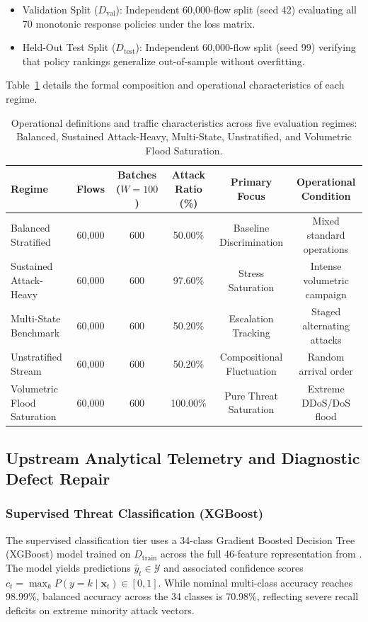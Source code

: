 \documentclass[journal,10pt,onecolumn]{IEEEtran}
\begin{document}
\begin{enumerate}
\begin{itemize}
        \item Validation Split ($D_{\text{val}}$): Independent 60,000-flow split (seed 42) evaluating all 70 monotonic response policies under the loss matrix.
        \item Held-Out Test Split ($D_{\text{test}}$): Independent 60,000-flow split (seed 99) verifying that policy rankings generalize out-of-sample without overfitting.
    \end{itemize}
\end{enumerate}

Table~\ref{tab:regimes_definition} details the formal composition and operational characteristics of each regime.

\begin{table}[t]
\caption{Operational definitions and traffic characteristics across five evaluation regimes: Balanced, Sustained Attack-Heavy, Multi-State, Unstratified, and Volumetric Flood Saturation.}
\label{tab:regimes_definition}
\centering
\small
\begin{tabular}{lccccc}
\toprule
\textbf{Regime} & \textbf{Flows} & \textbf{Batches ($W=100$)} & \textbf{Attack Ratio (\%)} & \textbf{Primary Focus} & \textbf{Operational Condition} \\
\midrule
Balanced Stratified & 60,000 & 600 & 50.00\% & Baseline Discrimination & Mixed standard operations \\
Sustained Attack-Heavy & 60,000 & 600 & 97.60\% & Stress Saturation & Intense volumetric campaign \\
Multi-State Benchmark & 60,000 & 600 & 50.20\% & Escalation Tracking & Staged alternating attacks \\
Unstratified Stream & 60,000 & 600 & 50.20\% & Compositional Fluctuation & Random arrival order \\
Volumetric Flood Saturation & 60,000 & 600 & 100.00\% & Pure Threat Saturation & Extreme DDoS/DoS flood \\
\bottomrule
\end{tabular}
\end{table}

\subsection{Upstream Analytical Telemetry and Diagnostic Defect Repair}

\subsubsection{Supervised Threat Classification (XGBoost)}
The supervised classification tier uses a 34-class Gradient Boosted Decision Tree (XGBoost) model trained on $D_{\text{train}}$ across the full 46-feature representation from \cite{1}. The model yields predictions $\hat{y}_t \in \mathcal{Y}$ and associated confidence scores $c_t = \max_k P(y=k \mid \mathbf{x}_t) \in [0, 1]$. While nominal multi-class accuracy reaches 98.99\%, balanced accuracy across the 34 classes is 70.98\%, reflecting severe recall deficits on extreme minority attack vectors.
\end{document}

